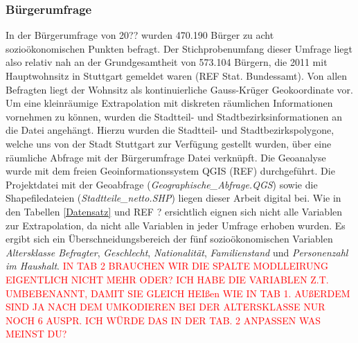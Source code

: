 \documentclass{Vorlage}
\begin{document}
\subsubsection{Bürgerumfrage}
In der Bürgerumfrage von 20?? wurden 470.190 Bürger zu acht sozioökonomischen Punkten befragt. Der Stichprobenumfang dieser Umfrage liegt also relativ nah an der Grundgesamtheit von 573.104 Bürgern, die 2011 mit Hauptwohnsitz in Stuttgart gemeldet waren (REF Stat. Bundessamt). Von allen Befragten liegt der Wohnsitz als kontinuierliche Gauss-Krüger Geokoordinate vor. Um eine kleinräumige Extrapolation mit diskreten räumlichen Informationen vornehmen zu können, wurden die Stadtteil- und Stadtbezirksinformationen an die Datei angehängt. Hierzu wurden die Stadtteil- und Stadtbezirkspolygone, welche uns von der Stadt Stuttgart zur Verfügung gestellt wurden, über eine räumliche Abfrage mit der Bürgerumfrage Datei verknüpft. Die Geoanalyse wurde mit dem freien Geoinformationssystem QGIS (REF) durchgeführt. Die Projektdatei mit der Geoabfrage (\textit{Geographische\_Abfrage.QGS}) sowie die Shapefiledateien (\textit{Stadtteile\_netto.SHP}) liegen dieser Arbeit digital bei. Wie in den Tabellen \ref{Datensatz} und REF ? ersichtlich eignen sich nicht alle Variablen zur Extrapolation, da nicht alle Variablen in jeder Umfrage erhoben wurden. Es ergibt sich ein Überschneidungsbereich der fünf sozioökonomischen Variablen \textit{Altersklasse Befragter}, \textit{Geschlecht}, \textit{Nationalität}, \textit{Familienstand} und \textit{Personenzahl im Haushalt}. \textcolor{red}{IN TAB 2 BRAUCHEN WIR DIE SPALTE MODLLEIRUNG EIGENTLICH NICHT MEHR ODER? ICH HABE DIE VARIABLEN Z.T. UMBEBENANNT, DAMIT SIE GLEICH HEIßen WIE IN TAB 1. AUßERDEM SIND JA NACH DEM UMKODIEREN BEI DER ALTERSKLASSE NUR NOCH  6 AUSPR. ICH WÜRDE DAS IN DER TAB. 2 ANPASSEN WAS MEINST DU?}
\end{document}

